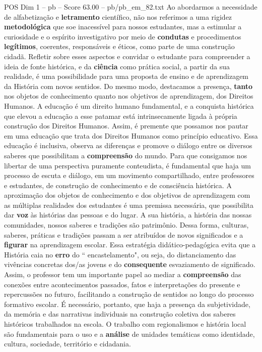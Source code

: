 \begin{textsample}{POS Dim 1 – pb – Score 63.00 – pb/pb\_em\_82.txt}
Ao abordarmos a necessidade de alfabetização e \textbf{letramento} científico, não nos referimos a uma rigidez \textbf{metodológica} que soe inacessível para nossos estudantes, mas a estimular a curiosidade e o espírito investigativo por meio de \textbf{condutas} e procedimentos \textbf{legítimos}, coerentes, responsáveis e éticos, como parte de uma construção cidadã.
Refletir sobre esses aspectos e convidar o estudante para compreender a ideia de fonte histórica, e da \textbf{ciência} como prática social, a partir da sua realidade, é uma possibilidade para uma proposta de ensino e de aprendizagem da História com novos sentidos.
Do mesmo modo, destacamos a presença, \textbf{tanto} nos objetos de conhecimento quanto nos objetivos de aprendizagem, dos Direitos Humanos.
A educação é um direito humano fundamental, e a conquista histórica que elevou a educação a esse patamar está intrinsecamente ligada à própria construção dos Direitos Humanos.
Assim, é premente que possamos nos pautar em uma educação que trata dos Direitos Humanos como princípio educativo.
Essa educação é inclusiva, observa as diferenças e promove o diálogo entre os diversos saberes que possibilitam a \textbf{compreensão} do mundo.
Para que consigamos nos libertar de uma perspectiva puramente conteudista, é fundamental que haja um processo de escuta e diálogo, em um movimento compartilhado, entre professores e estudantes, de construção de conhecimento e de consciência histórica.
A aproximação dos objetos de conhecimento e dos objetivos de aprendizagem com as múltiplas realidades dos estudantes é uma premissa necessária, que possibilita dar \textbf{voz} às histórias das pessoas e do lugar.
A sua história, a história das nossas comunidades, nossos saberes e tradições são patrimônio.
Dessa forma, culturas, saberes, práticas e tradições passam a ser atribuídos de novos significados e a \textbf{figurar} na aprendizagem escolar.
Essa estratégia didático-pedagógica evita que a História caia no \textbf{erro} do “ encastelamento", ou seja, do distanciamento das vivências concretas dos/as jovens e do \textbf{consequente} esvaziamento de significado.
Assim, o professor tem um importante papel ao mediar a \textbf{compreensão} das conexões entre acontecimentos passados, fatos e interpretações do presente e repercussões no futuro, facilitando a construção de sentidos ao longo do processo formativo escolar.
É necessário, portanto, que haja a presença da subjetividade, da memória e das narrativas individuais na construção coletiva dos saberes históricos trabalhados na escola.
O trabalho com regionalismos e história local são fundamentais para o uso e a \textbf{análise} de unidades temáticas como identidade, cultura, sociedade, território e cidadania.

\end{textsample}
